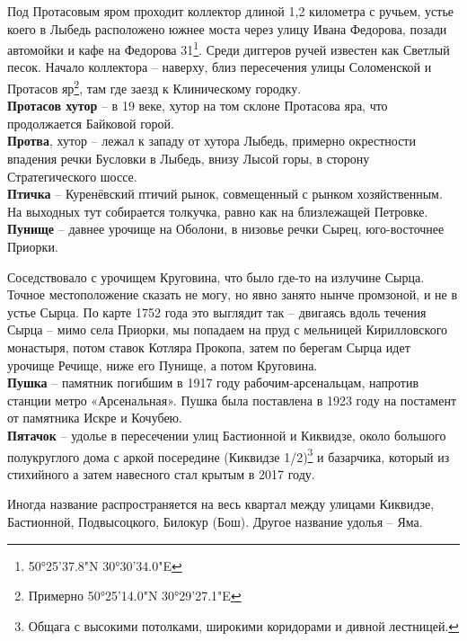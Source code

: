 Под Протасовым яром проходит коллектор длиной 1,2 километра с ручьем, устье коего в Лыбедь расположено южнее моста через улицу Ивана Федорова, позади автомойки и кафе на Федорова 31\footnote{50°25'37.8"N 30°30'34.0"E}. Среди диггеров ручей известен как Светлый песок. Начало коллектора – наверху, близ пересечения улицы Соломенской и Протасов яр\footnote{Примерно 50°25'14.0"N 30°29'27.1"E}, там где заезд к Клиническому городку.\\

\textbf{Протасов хутор} – в 19 веке, хутор на том склоне Протасова яра, что продолжается Байковой горой.\\

\textbf{Протва}, хутор – лежал к западу от хутора Лыбедь, примерно окрестности впадения речки Бусловки в Лыбедь, внизу Лысой горы, в сторону Стратегического шоссе.\\ 

\textbf{Птичка} – Куренёвский птичий рынок, совмещенный с рынком хозяйственным. На выходных тут собирается толкучка, равно как на близлежащей Петровке.\\

\textbf{Пунище} – давнее урочище на Оболони, в низовье речки Сырец, юго-восточнее Приорки.

Соседствовало с урочищем Круговина, что было где-то на излучине Сырца. Точное местоположение сказать не могу, но явно занято нынче промзоной, и не в устье Сырца. По карте 1752 года это выглядит так – двигаясь вдоль течения Сырца – мимо села Приорки, мы попадаем на пруд с мельницей Кирилловского монастыря, потом ставок Котляра Прокопа, затем по берегам Сырца идет урочище Речище, ниже его Пунище, а потом Круговина.\\

\textbf{Пушка} – памятник погибшим в 1917 году рабочим-арсенальцам, напротив станции метро «Арсенальная». Пушка была поставлена в 1923 году на постамент от памятника Искре и Кочубею.\\

\textbf{Пятачок} – удолье в пересечении улиц Бастионной и Киквидзе, около большого полукруглого дома с аркой посередине (Киквидзе 1/2)\footnote{Общага с высокими потолками,  широкими коридорами и дивной лестницей.} и базарчика, который из стихийного а затем навесного стал крытым в 2017 году.

Иногда название распространяется на весь квартал между улицами Киквидзе, Бастионной, Подвысоцкого, Билокур (Бош). Другое название удолья – Яма.

